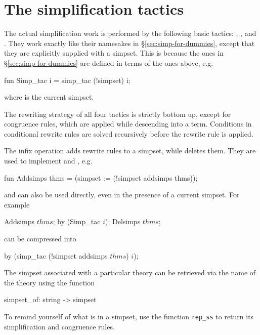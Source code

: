 \section{The simplification tactics}
\label{simp-tactics}

The actual simplification work is performed by the following basic tactics:
, ,
 and . They work
exactly like their namesakes in \S\ref{sec:simp-for-dummies}, except that
they are explicitly supplied with a simpset. This is because the ones in
\S\ref{sec:simp-for-dummies} are defined in terms of the ones above, e.g.
\begin{ttbox}
fun Simp_tac i = simp_tac (!simpset) i;
\end{ttbox}
where  is the current simpset.

The rewriting strategy of all four tactics is strictly bottom up, except for
congruence rules, which are applied while descending into a term.  Conditions
in conditional rewrite rules are solved recursively before the rewrite rule
is applied.

The infix operation  adds rewrite rules to a
simpset, while  deletes them.  They are used to
implement  and , e.g.
\begin{ttbox}
fun Addsimps thms = (simpset := (!simpset addsimps thms));
\end{ttbox}
and can also be used directly, even in the presence of a current simpset. For
example
\begin{ttbox}
Addsimps \(thms\);
by (Simp_tac \(i\));
Delsimps \(thms\);
\end{ttbox}
can be compressed into
\begin{ttbox}
by (simp_tac (!simpset addsimps \(thms\)) \(i\));
\end{ttbox}

The simpset associated with a particular theory can be retrieved via the name
of the theory using the function
\begin{ttbox}
simpset_of: string -> simpset
\end{ttbox}

To remind yourself of what is in a simpset, use the function \verb$rep_ss$ to
return its simplification and congruence rules.

